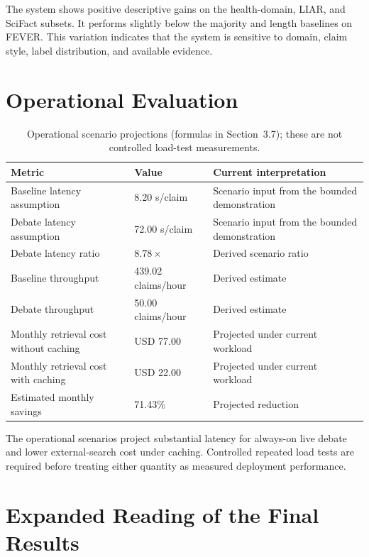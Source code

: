 \documentclass[12pt,a4paper,openany]{report}
\begin{document}
The system shows positive descriptive gains on the health-domain, LIAR, and SciFact subsets. It performs slightly below the majority and length baselines on FEVER. This variation indicates that the system is sensitive to domain, claim style, label distribution, and available evidence.

\section{Operational Evaluation}
\begin{table}[H]
\centering
\caption{Operational scenario projections (formulas in Section~3.7); these are not controlled load-test measurements.}
\label{tab:operational}
\small
\begin{tabularx}{\textwidth}{p{5.5cm}p{2.6cm}X}
\toprule
Metric & Value & Current interpretation \\
\midrule
Baseline latency assumption & 8.20 s/claim & Scenario input from the bounded demonstration \\
Debate latency assumption & 72.00 s/claim & Scenario input from the bounded demonstration \\
Debate latency ratio & $8.78\times$ & Derived scenario ratio \\
Baseline throughput & 439.02 claims/hour & Derived estimate \\
Debate throughput & 50.00 claims/hour & Derived estimate \\
Monthly retrieval cost without caching & USD 77.00 & Projected under current workload \\
Monthly retrieval cost with caching & USD 22.00 & Projected under current workload \\
Estimated monthly savings & 71.43\% & Projected reduction \\
\bottomrule
\end{tabularx}
\end{table}

The operational scenarios project substantial latency for always-on live debate and lower external-search cost under caching. Controlled repeated load tests are required before treating either quantity as measured deployment performance.

\section{Expanded Reading of the Final Results}
\label{ch:expanded-reading}
\end{document}
